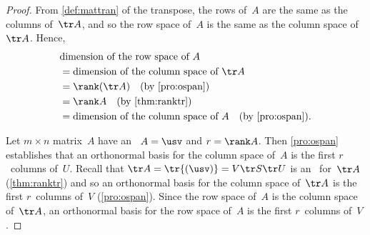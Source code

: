 \begin{proof} 
From \cref{def:mattran} of the transpose, the rows of~\(A\) are the same as the columns of~\(\tr A\), and so the row space of~\(A\) is the same as the column space of~\(\tr A\).  
Hence,
\begin{align*}
&\text{dimension of the row space of }A
\\&=\text{dimension of the column space of }\tr A
\\&=\rank(\tr A) \quad(\text{by \cref{pro:ospan}})
\\&=\rank A \quad(\text{by \cref{thm:ranktr}})
\\&=\text{dimension of the column space of }A
\quad(\text{by \cref{pro:ospan}}).
\end{align*}

Let \(m\times n\) matrix~\(A\) have an \svd\ \(A=\usv\) and \(r=\rank A\).
Then \cref{pro:ospan} establishes that an orthonormal basis for the column space of~\(A\) is the first \(r\)~columns of~\(U\).
Recall that \(\tr A=\tr{(\usv)} =V\tr S\tr U\) is an \svd\ for~\(\tr A\) (\cref{thm:ranktr}) and so an orthonormal basis for the column space of~\(\tr A\) is the first \(r\)~columns of~\(V\) (\cref{pro:ospan}).
Since the row space of~\(A\) is the column space of~\(\tr A\), an orthonormal basis for the row space of~\(A\) is the first \(r\)~columns of~\(V\).
\end{proof}


